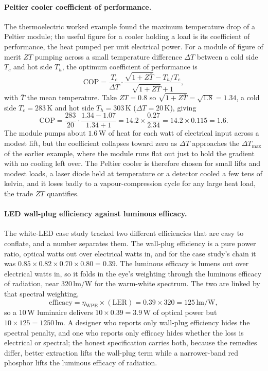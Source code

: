\paragraph{Peltier cooler coefficient of performance.}
The thermoelectric worked example found the maximum temperature drop of a
Peltier module; the useful figure for a cooler holding a load is its
coefficient of performance, the heat pumped per unit electrical power. For a
module of figure of merit $ZT$ pumping across a small temperature difference
$\Delta T$ between a cold side $T_c$ and hot side $T_h$, the optimum
coefficient of performance is
\[
\mathrm{COP} = \frac{T_c}{\Delta T}\cdot
\frac{\sqrt{1 + Z\bar T} - T_h/T_c}{\sqrt{1 + Z\bar T} + 1},
\]
with $\bar T$ the mean temperature. Take $ZT = 0.8$ so $\sqrt{1 + Z\bar T} =
\sqrt{1.8} = 1.34$, a cold side $T_c = 283\,\si{\kelvin}$ and hot side
$T_h = 303\,\si{\kelvin}$ ($\Delta T = 20\,\si{\kelvin}$), giving
\[
\mathrm{COP} = \frac{283}{20}\cdot\frac{1.34 - 1.07}{1.34 + 1} =
14.2\times\frac{0.27}{2.34} = 14.2\times 0.115 = 1.6.
\]
The module pumps about $1.6\,\si{\watt}$ of heat for each watt of electrical
input across a modest lift, but the coefficient collapses toward zero as
$\Delta T$ approaches the $\Delta T_{\max}$ of the earlier example, where the
module runs flat out just to hold the gradient with no cooling left over. The
Peltier cooler is therefore chosen for small lifts and modest loads, a laser
diode held at temperature or a detector cooled a few tens of kelvin, and it
loses badly to a vapour-compression cycle for any large heat load, the trade
$ZT$ quantifies.

\paragraph{LED wall-plug efficiency against luminous efficacy.}
The white-LED case study tracked two different efficiencies that are easy to
conflate, and a number separates them. The wall-plug efficiency is a pure
power ratio, optical watts out over electrical watts in, and for the case
study's chain it was $0.85\times 0.82\times 0.70\times 0.80 = 0.39$. The
luminous efficacy is lumens out over electrical watts in, so it folds in the
eye's weighting through the luminous efficacy of radiation, near
$320\,\si{\lumen\per\watt}$ for the warm-white spectrum. The two are linked
by that spectral weighting,
\[
\text{efficacy} = \eta_{\text{WPE}}\times(\text{LER})
= 0.39\times 320 = 125\,\si{\lumen\per\watt},
\]
so a $10\,\si{\watt}$ luminaire delivers $10\times 0.39 = 3.9\,\si{\watt}$
of optical power but $10\times 125 = 1250\,\si{\lumen}$. A designer who
reports only wall-plug efficiency hides the spectral penalty, and one who
reports only efficacy hides whether the loss is electrical or spectral; the
honest specification carries both, because the remedies differ, better
extraction lifts the wall-plug term while a narrower-band red phosphor lifts
the luminous efficacy of radiation.

